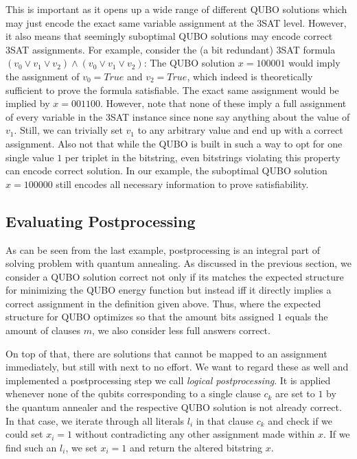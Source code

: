 This is important as it opens up a wide range of different QUBO solutions which may just encode the exact same variable assignment at the 3SAT level. However, it also means that seemingly suboptimal QUBO solutions may encode correct 3SAT assignments. For example, consider the (a bit redundant) 3SAT formula $(v_0 \lor v_1 \lor v_2) \land (v_0 \lor v_1 \lor v_2)$: The QUBO solution $x = 100001$ would imply the assignment of $v_0 = \textit{True}$ and $v_2 = \textit{True}$, which indeed is theoretically sufficient to prove the formula satisfiable. The exact same assignment would be implied by $x = 001100$. However, note that none of these imply a full assignment of every variable in the 3SAT instance since none say anything about the value of $v_1$. Still, we can trivially set $v_1$ to any arbitrary value and end up with a correct assignment. Also not that while the QUBO is built in such a way to opt for one single value $1$ per triplet in the bitstring, even bitstrings violating this property can encode correct solution. In our example, the suboptimal QUBO solution $x=100000$ still encodes all necessary information to prove satisfiability.

\subsection{Evaluating Postprocessing}

As can be seen from the last example, postprocessing is an integral part of solving problem with quantum annealing. As discussed in the previous section, we consider a QUBO solution correct not only if its matches the expected structure for minimizing the QUBO energy function but instead iff it directly implies a correct assignment in the definition given above. Thus, where the expected structure for QUBO optimizes so that the amount bits assigned $1$ equals the amount of clauses $m$, we also consider less full answers correct.

On top of that, there are solutions that cannot be mapped to an assignment immediately, but still with next to no effort. We want to regard these as well and implemented a postprocessing step we call \emph{logical postprocessing}. It is applied whenever none of the qubits corresponding to a single clause $c_k$ are set to $1$ by the quantum annealer and the respective QUBO solution is not already correct. In that case, we iterate through all literals $l_i$ in that clause $c_k$ and check if we could set $x_i = 1$ without contradicting any other assignment made within $x$. If we find such an $l_i$, we set $x_i = 1$ and return the altered bitstring $x$.

